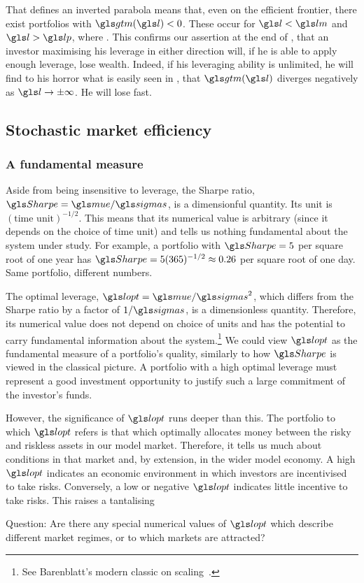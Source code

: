 That  defines an inverted parabola means that, even on the efficient frontier, there exist portfolios with $\gtm(\l) < 0$. These occur for $\l<\lm$ and $\l>\lp$, where
\be 
\lpm \equiv \lopt \pm {}.
\ee
This confirms our assertion at the end of , that an investor maximising his leverage in either direction will, if he is able to apply enough leverage, lose wealth. Indeed, if his leveraging ability is unlimited, he will find to his horror what is easily seen in , that $\gtm(\l)$ diverges negatively as $\l\to\pm\infty$. He will lose fast.

\subsection{Stochastic market efficiency}


\subsubsection{A fundamental measure}
Aside from being insensitive to leverage, the Sharpe ratio, $\Sharpe=\mue/\sigmas$, is a dimensionful quantity. Its unit is $(\text{time unit})^{-1/2}$. This means that its numerical value is arbitrary (since it depends on the choice of time unit) and tells us nothing fundamental about the system under study. For example, a portfolio with $\Sharpe=5$ per square root of one year has $\Sharpe=5(365)^{-1/2}\approx0.26$ per square root of one day. Same portfolio, different numbers.

The optimal leverage, $\lopt=\mue/\sigmas^2$, which differs from the Sharpe ratio by a factor of $1/\sigmas$, is a dimensionless quantity. Therefore, its numerical value does not depend on choice of units and has the potential to carry fundamental information about the system.\footnote{See Barenblatt's modern classic on scaling~\cite{Barenblatt2003}.} We could view $\lopt$ as the fundamental measure of a portfolio's quality, similarly to how $\Sharpe$ is viewed in the classical picture. A portfolio with a high optimal leverage must represent a good investment opportunity to justify such a large commitment of the investor's funds.

However, the significance of $\lopt$ runs deeper than this. The portfolio to which $\lopt$ refers is that which optimally allocates money between the risky and riskless assets in our model market. Therefore, it tells us much about conditions in that market and, by extension, in the wider model economy. A high $\lopt$ indicates an economic environment in which investors are incentivised to take risks. Conversely, a low or negative $\lopt$ indicates little incentive to take risks. This raises a tantalising
\begin{keypts}{Question:}
Are there any special numerical values of $\lopt$ which describe different market regimes, or to which markets are attracted?
\end{keypts}

